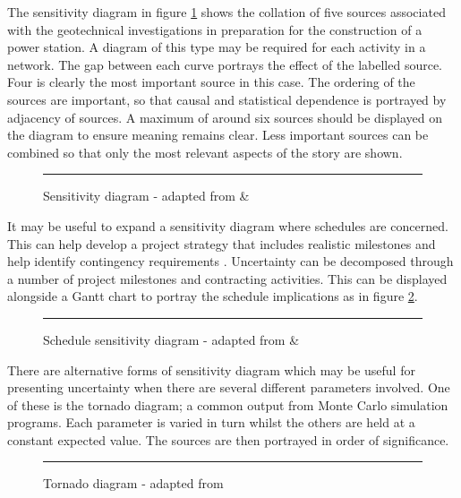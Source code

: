 The sensitivity diagram in figure \ref{Figure:SensDiag} shows the collation of five sources associated with the geotechnical investigations in preparation for the construction of a power station.
A diagram of this type may be required for each activity in a network.
The gap between each curve portrays the effect of the labelled source.
Four is clearly the most important source in this case. 
The ordering of the sources are important, so that causal and statistical dependence is portrayed by adjacency of sources.
A maximum of around six sources should be displayed on the diagram to ensure meaning remains clear.
Less important sources can be combined so that only the most relevant aspects of the story are shown.

\begin{figure}[!h]
  \centering
  \rule{5cm}{5cm}
\caption{Sensitivity diagram - adapted from \cite{chapman} \& \cite{hopkinson2008}}
\label{Figure:SensDiag}
\end{figure}

It may be useful to expand a sensitivity diagram where schedules are concerned. 
This can help develop a project strategy that includes realistic milestones and help identify contingency requirements \citep{hopkinson2008}.
Uncertainty can be decomposed through a number of project milestones and contracting activities.
This can be displayed alongside a Gantt chart to portray the schedule implications as in figure \ref{Figure:SensDiagGantt}.

\begin{figure}[!h]
  \centering
  \rule{5cm}{5cm}
\caption{Schedule sensitivity diagram - adapted from \cite{hopkinson2008} \& \cite{chapman} }
\label{Figure:SensDiagGantt}
\end{figure}

There are alternative forms of sensitivity diagram which may be useful for presenting uncertainty when there are several different parameters involved. 
One of these is the tornado diagram; a common output from Monte Carlo simulation programs.
Each parameter is varied in turn whilst the others are held at a constant expected value.
The sources are then portrayed in order of significance.

\begin{figure}[!h]
  \centering
  \rule{5cm}{5cm}
\caption{Tornado diagram - adapted from \cite{hopkinson2008}}
\label{Figure:Tornado}
\end{figure}

